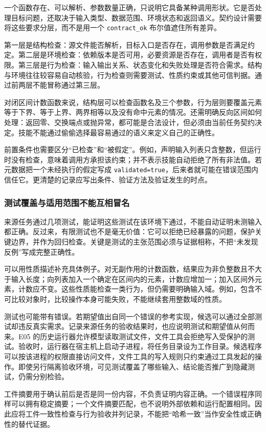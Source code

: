一个函数存在、可以解析、参数数量正确，只说明它具备某种调用形状。它是否处理目标问题，还取决于输入类型、数据范围、环境状态和返回语义。契约设计需要将这些要求分层，而不是用一个 \texttt{contract\_ok} 布尔值遮住所有差异。

第一层是结构检查：源文件能否解析，目标入口是否存在，调用参数是否满足约定。第二层是环境检查：依赖版本是否可用，必要资源是否存在，调用者是否有权限。第三层是行为检查：输入输出关系、状态变化和失败处理是否符合需求。结构与环境往往较容易自动核验，行为检查则需要测试、性质约束或其他可信判据。通过前两层不能冒称通过第三层。

对闭区间计数函数来说，结构层可以检查函数名及三个参数，行为层则要覆盖元素等于下界、等于上界、两界相等以及没有命中元素的情况。还需明确反向区间如何处理：返回零、交换端点或抛异常，都可能是合法设计，但必须由当前任务契约决定。技能不能通过偷偷选择最容易通过的语义来定义自己的正确性。

前置条件也需要区分“已检查”和“被假定”。例如，声明输入列表只含整数，但运行时没有检查，意味着调用方承担该约束；并不表示技能自动拒绝了所有非法值。若元数据把一个未经执行的假定写成 \texttt{validated=true}，后来者就可能在错误范围内信任它。更清楚的记录应写出条件、验证方法及验证发生的时点。

\subsubsection{测试覆盖与适用范围不能互相冒名}

来源任务通过几项测试，能证明这些测试在该环境下通过，不能自动证明未测输入都正确。反过来，有限测试也不是毫无价值：它可以拒绝已经暴露的问题，保护关键边界，并作为回归检查。关键是测试的主张范围必须与证据相称，不把“未发现反例”写成完整正确性。

可以用性质描述补充具体例子。对无副作用的计数函数，结果应为非负整数且不大于输入长度；向列表加入一个确定在区间内的元素，计数应增加一；加入区间外元素，计数应不变。这些性质能检查一类行为，但仍需要明确输入域。例如，包含不可比较对象时，比较操作本身可能失败，不能继续套用整数域的性质。

测试也可能带有错误。若期望值出自同一个错误的参考实现，候选可以通过全部测试却违反真实需求。记录来源任务的验收结果时，也应说明测试和期望值从何而来。E05 的历史运行器允许模型读取测试文件，文件工具会拒绝写入受保护的测试。验收时，运行器在宿主机上启动子进程，将任务目录设为工作目录。候选程序可以按该进程的权限直接访问文件，文件工具的写入规则只约束通过工具发起的操作。即使另行隔离验收环境，可见测试覆盖了哪些输入、结论能否推广到隐藏测试，仍需分别检验。

工件摘要用于确认前后是否是同一份内容，不负责证明内容正确。一个错误程序同样可以拥有稳定摘要；一个文件摘要匹配，也不说明外部依赖和运行配置相同。因此应将工件一致性检查与行为验收并列记录，不能把“哈希一致”当作安全性或正确性的替代证据。

